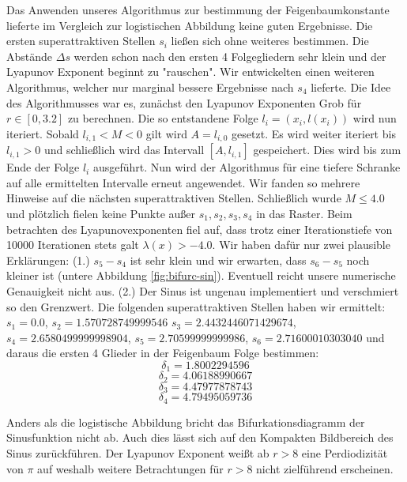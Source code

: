 \documentclass{scrartcl}
\begin{document}
Das Anwenden unseres Algorithmus zur bestimmung der Feigenbaumkonstante lieferte im Vergleich zur logistischen Abbildung keine guten Ergebnisse. Die ersten superattraktiven Stellen $s_i$ ließen sich ohne weiteres bestimmen. Die Abstände $\Delta s$ werden schon nach den ersten 4 Folgegliedern sehr klein und der Lyapunov Exponent beginnt zu "rauschen". 
Wir entwickelten einen weiteren Algorithmus, welcher nur marginal bessere Ergebnisse nach $s_4$ lieferte. Die Idee des Algorithmusses war es, zunächst den Lyapunov Exponenten Grob für $r\in [0,3.2]$ zu berechnen. 
Die so entstandene Folge $l_i=(x_i, l(x_i))$ wird nun iteriert. Sobald $l_{i,1} < M < 0$ gilt wird $A=l_{i,0}$ gesetzt. Es wird weiter iteriert bis $l_{i,1} > 0$ und schließlich wird das Intervall $[A, l_{i,1}]$ gespeichert. Dies wird bis zum Ende der Folge $l_i$ ausgeführt. 
Nun wird der Algorithmus für eine tiefere Schranke auf alle ermittelten Intervalle erneut angewendet. 
Wir fanden so mehrere Hinweise auf die nächsten superattraktiven Stellen. 
Schließlich wurde $M \leq 4.0$ und plötzlich fielen keine Punkte außer $s_1, s_2, s_3, s_4$ in das Raster. Beim betrachten des Lyapunovexponenten fiel auf, dass trotz einer Iterationstiefe von 10000 Iterationen stets galt $\lambda(x)>-4.0$. 
Wir haben dafür nur zwei plausible Erklärungen: 
(1.) $s_5-s_4$ ist sehr klein und wir erwarten, dass $s_6-s_5$ noch kleiner ist (untere Abbildung \ref{fig:bifurc-sin}). Eventuell reicht unsere numerische Genauigkeit nicht aus. 
(2.) Der Sinus ist ungenau implementiert und verschmiert so den Grenzwert. 
Die folgenden superattraktiven Stellen haben wir ermittelt: $s_1=0.0$, $s_2=1.570728749999546$ $s_3=2.4432446071429674$, $s_4=2.6580499999998904$, $s_5=2.70599999999986$, $s_6=2.71600010303040$ und daraus die ersten 4 Glieder in der Feigenbaum Folge bestimmen:
$$\delta_1=1.8002294596$$
$$\delta_2=4.06188990667$$
$$\delta_3=4.47977878743$$
$$\delta_4=4.79495059736$$

Anders als die logistische Abbildung bricht das Bifurkationsdiagramm der Sinusfunktion nicht ab. Auch dies lässt sich auf den Kompakten Bildbereich des Sinus zurückführen. Der Lyapunov Exponent weißt ab $r>8$ eine Perdiodizität von $\pi$ auf weshalb weitere Betrachtungen für $r>8$ nicht zielführend erscheinen.
\end{document}
